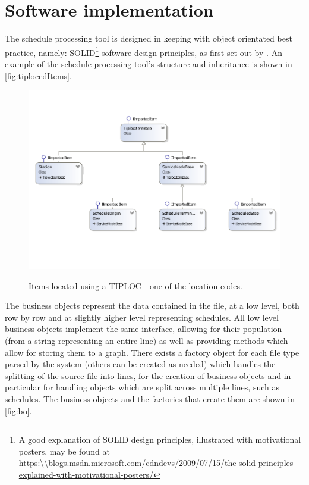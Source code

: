 \section{Software implementation} 
The schedule processing tool is designed in keeping with object orientated best practice, namely: SOLID\footnote{A good explanation of SOLID design principles, illustrated with motivational posters, may be found at \url{https:\\blogs.msdn.microsoft.com/cdndevs/2009/07/15/the-solid-principles-explained-with-motivational-posters/}} software design principles, as first set out by \citet{Martin2003}. An example of the schedule processing tool's structure and inheritance is shown in \autoref{fig:tiplocedItems}.  

 \begin{figure}[!h]
\myfloatalign
{\includegraphics[width=\linewidth]{gfx/ItemsWithTIPLOCsResized}} 
\caption{Items located using a TIPLOC - one of the location codes.}
\label{fig:tiplocedItems}
\end{figure}

The business objects represent the data contained in the file, at a low level, both row by row and at slightly higher level representing schedules. All low level business objects implement the same interface, allowing for their population (from a string representing an entire line) as well as providing methods which allow for storing them to a graph. There exists a factory object for each file type parsed by the system (others can be created as needed) which handles the splitting of the source file into lines, for the creation of business objects and in particular for handling objects which are split across multiple lines, such as schedules. The business objects and the factories that create them are shown in \autoref{fig:bo}.

